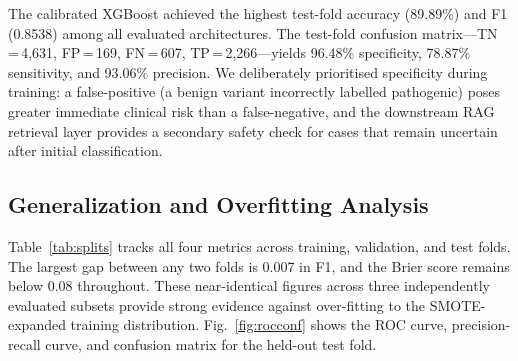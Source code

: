 \documentclass[12pt,a4paper]{article}
\begin{document}
The calibrated XGBoost achieved the highest test-fold accuracy
(89.89\%) and F1 (0.8538) among all evaluated architectures.
The test-fold confusion matrix---TN\,=\,4,631,
FP\,=\,169, FN\,=\,607, TP\,=\,2,266---yields 96.48\% specificity,
78.87\% sensitivity, and 93.06\% precision. We deliberately
prioritised specificity during training: a false-positive (a benign
variant incorrectly labelled pathogenic) poses greater immediate
clinical risk than a false-negative, and the downstream RAG
retrieval layer provides a secondary safety check for cases that
remain uncertain after initial classification.

\begin{table}[H]
\caption{Model Comparison --- Held-Out Evaluation Metrics.
  Rows 1--4 report validation-fold results; neural networks and the
  deployed model are evaluated on the held-out test fold.}
\label{tab:results}
\begin{center}
\end{center}
\end{table}

\subsection{Generalization and Overfitting Analysis}

Table~\ref{tab:splits} tracks all four metrics across training,
validation, and test folds. The largest gap between any two folds
is 0.007 in F1, and the Brier score remains below 0.08 throughout.
These near-identical figures across three independently evaluated
subsets provide strong evidence against over-fitting to the
SMOTE-expanded training distribution.
Fig.~\ref{fig:rocconf} shows the ROC curve, precision-recall
curve, and confusion matrix for the held-out test fold.
\end{document}
